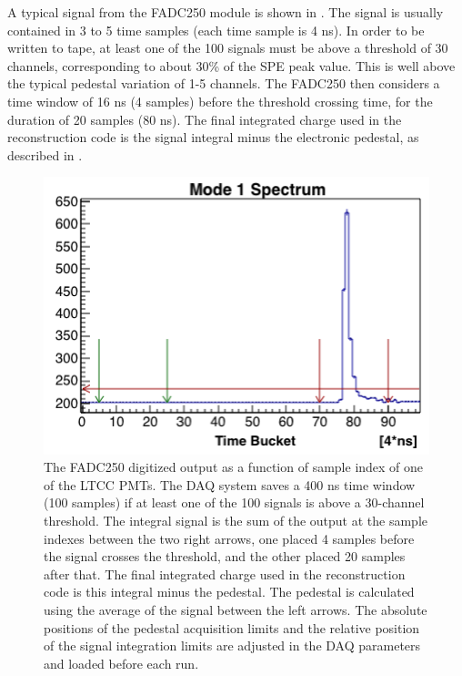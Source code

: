A typical signal from the FADC250 module is shown in . The signal is usually contained in 3 to 5 time samples
(each time sample is 4 ns).
In order to be written to tape, at least one of the 100 signals must be above a threshold of 30 channels, corresponding to about
30\% of the SPE peak value. This is well above the typical pedestal variation of 1-5 channels.
The FADC250 then considers a time window of 16 ns (4 samples) before the threshold crossing time, for the duration
of 20 samples (80 ns). The final integrated charge used in the reconstruction code is the signal integral
minus the electronic pedestal, as described in .



\begin{figure}
	\centering
	\includegraphics[width=0.95\columnwidth,keepaspectratio]{img/fadc.png}
	\caption{The FADC250 digitized output as a function of sample index of one of the LTCC PMTs.
             The DAQ system saves a 400 ns time window (100 samples) if at least one of the 100 signals is above a 30-channel threshold.
		     The integral signal is the sum of the output at the sample indexes between the two right arrows,
             one placed 4 samples before the signal crosses the threshold, and the other placed 20 samples after that.
             The final integrated charge used in the reconstruction code is this integral minus the pedestal.
             The pedestal is calculated using the average of the signal between the left arrows.
		     The absolute positions of the pedestal acquisition limits and the relative position of the signal integration
             limits are adjusted in the DAQ parameters and loaded before each run.}
	\label{fig:fadc}
\end{figure}




